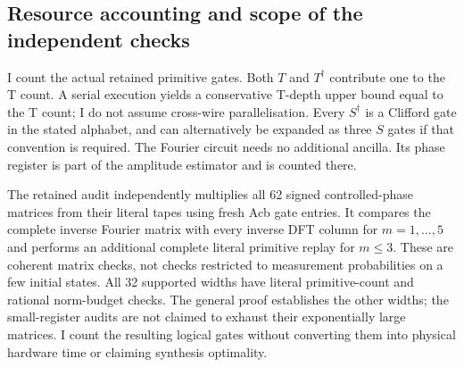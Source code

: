 \subsection{Resource accounting and scope of the independent checks}

I count the actual retained primitive gates. Both $T$ and $T^{\dagger}$ contribute one to the T count. A serial execution yields a conservative T-depth upper bound equal to the T count; I do not assume cross-wire parallelisation. Every $S^{\dagger}$ is a Clifford gate in the stated alphabet, and can alternatively be expanded as three $S$ gates if that convention is required. The Fourier circuit needs no additional ancilla. Its phase register is part of the amplitude estimator and is counted there.

The retained audit independently multiplies all 62 signed controlled-phase matrices from their literal tapes using fresh Acb gate entries. It compares the complete inverse Fourier matrix with every inverse DFT column for $m=1,\ldots,5$ and performs an additional complete literal primitive replay for $m\leq3$. These are coherent matrix checks, not checks restricted to measurement probabilities on a few initial states. All 32 supported widths have literal primitive-count and rational norm-budget checks. The general proof establishes the other widths; the small-register audits are not claimed to exhaust their exponentially large matrices. I count the resulting logical gates without converting them into physical hardware time or claiming synthesis optimality.
